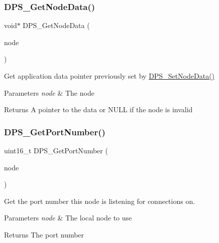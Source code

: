 \subsubsection{\texorpdfstring{D\+P\+S\+\_\+\+Get\+Node\+Data()}{DPS\_GetNodeData()}}
{\footnotesize\ttfamily void$\ast$ D\+P\+S\+\_\+\+Get\+Node\+Data (\begin{DoxyParamCaption}\item[{const \hyperlink{group__node_ga4dd612ab965134321bb57fdb065f121c}{D\+P\+S\+\_\+\+Node} $\ast$}]{node }\end{DoxyParamCaption})}



Get application data pointer previously set by \hyperlink{group__node_gad19cf4272ba11e935654175c83db2ce1}{D\+P\+S\+\_\+\+Set\+Node\+Data()} 


\begin{DoxyParams}{Parameters}
{\em node} & The node\\
\hline
\end{DoxyParams}
\begin{DoxyReturn}{Returns}
A pointer to the data or N\+U\+LL if the node is invalid 
\end{DoxyReturn}
\mbox{\label{group__node_gaf920b28fe0721a7f97b11673494d7b36}} 
\subsubsection{\texorpdfstring{D\+P\+S\+\_\+\+Get\+Port\+Number()}{DPS\_GetPortNumber()}}
{\footnotesize\ttfamily uint16\+\_\+t D\+P\+S\+\_\+\+Get\+Port\+Number (\begin{DoxyParamCaption}\item[{\hyperlink{group__node_ga4dd612ab965134321bb57fdb065f121c}{D\+P\+S\+\_\+\+Node} $\ast$}]{node }\end{DoxyParamCaption})}



Get the port number this node is listening for connections on. 


\begin{DoxyParams}{Parameters}
{\em node} & The local node to use\\
\hline
\end{DoxyParams}
\begin{DoxyReturn}{Returns}
The port number 
\end{DoxyReturn}
\mbox{\label{group__node_ga5064c63b8ce76bf34402e0c80183234b}} 
